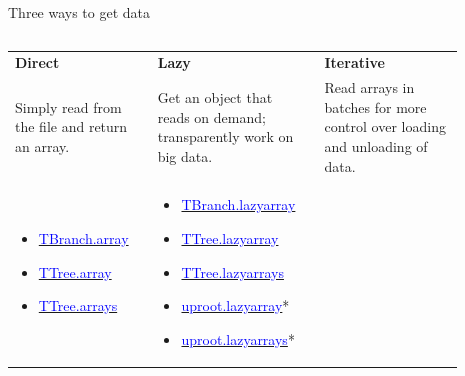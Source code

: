 \documentclass[aspectratio=169]{beamer}
\begin{document}
\begin{frame}{Three ways to get data}
\vspace{0.5 cm}
\begin{columns}

\renewcommand{\arraystretch}{1.5}
\begin{tabular}{p{0.29\linewidth} c p{0.29\linewidth} c p{0.31\linewidth}}
{\LARGE\bf Direct} & & {\LARGE\bf Lazy} & & {\LARGE\bf Iterative} \\
Simply read from the file and return an array. & & Get an object that reads on demand; transparently work on big data. & & Read arrays in batches for more control over loading and unloading of data. \\
\begin{minipage}{\linewidth}
\vspace{0.5\baselineskip}
\begin{itemize}
\item \href{https://uproot.readthedocs.io/en/latest/ttree-handling.html\#id11}{\textcolor{blue}{TBranch.array}}
\item \href{https://uproot.readthedocs.io/en/latest/ttree-handling.html\#array}{\textcolor{blue}{TTree.array}}
\item \href{https://uproot.readthedocs.io/en/latest/ttree-handling.html\#arrays}{\textcolor{blue}{TTree.arrays}}
\end{itemize}
\vspace{2\baselineskip}
\end{minipage} & &
\begin{minipage}{\linewidth}
\vspace{0.5\baselineskip}
\begin{itemize}
\item \href{https://uproot.readthedocs.io/en/latest/ttree-handling.html\#id13}{\textcolor{blue}{TBranch.lazyarray}}
\item \href{https://uproot.readthedocs.io/en/latest/ttree-handling.html\#lazyarray}{\textcolor{blue}{TTree.lazyarray}}
\item \href{https://uproot.readthedocs.io/en/latest/ttree-handling.html\#lazyarrays}{\textcolor{blue}{TTree.lazyarrays}}
\item \href{https://uproot.readthedocs.io/en/latest/opening-files.html\#uproot-lazyarray-and-lazyarrays}{\textcolor{blue}{uproot.lazyarray}}*
\item \href{https://uproot.readthedocs.io/en/latest/opening-files.html\#uproot-lazyarray-and-lazyarrays}{\textcolor{blue}{uproot.lazyarrays}}*

\end{itemize}
\end{minipage}
\end{tabular}
\end{columns}
\end{frame}
\end{document}
